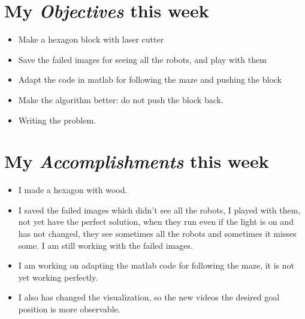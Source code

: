\newcommand{\handoutName}{Weekly report}
\newcommand{\handoutdate}{\today}


\section{My \emph{Objectives} this week}
\begin{itemize}
\item Make a hexagon block with laser cutter
\item Save the failed images for seeing all the robots, and play with them
\item Adapt the code in matlab for following the maze and pushing the block
\item Make the algorithm better: do not push the block back.
\item Writing the problem.
\end{itemize}


\section{My \emph{Accomplishments} this week}
\begin{itemize}
\item I made a hexagon with wood.
\item I saved the failed images which didn't see all the robots, I played with them, not yet have the perfect solution, when they run even if the light is on and has not changed, they see sometimes all the robots and sometimes it misses some. I am still working with the failed images.
\item I am working on adapting the matlab code for following the maze, it is not yet working perfectly.
\item I also has changed the visualization, so the new videos the desired goal position is more observable.
\end{itemize}





